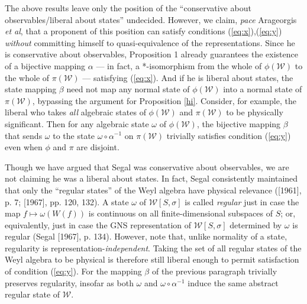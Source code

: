 \documentclass[12pt]{article}
\theoremstyle{remark}
\theoremstyle{definition}
\newcommand{\alg}[1]{\mathcal{#1}}
\begin{document}
The above results leave only the position of the ``conservative about
observables/liberal about states'' undecided.  However, we claim,
\emph{pace} Arageorgis \emph{et al}, that a proponent of this position
can satisfy conditions (\ref{eq:x}),(\ref{eq:y}) \emph{without}
committing himself to quasi-equivalence of the representations.  Since
he is conservative about observables, Proposition 1 already guarantees
the existence of a bijective mapping $\alpha$ --- in fact, a
*-isomorphism from the whole of $\phi(\alg{W})$ to the whole of
$\pi(\alg{W})$ --- satisfying (\ref{eq:x}).  And if he is liberal
about states, the state mapping $\beta$ need not map any normal state
of $\phi (\alg{W})$ into a normal state of $\pi (\alg{W})$, bypassing
the argument for Proposition \ref{hi}.  Consider, for example, the
liberal who takes \emph{all} algebraic states of $\phi(\alg{W})$ and
$\pi(\alg{W})$ to be physically significant.  Then for any algebraic
state $\omega$ of $\phi(\alg{W})$, the bijective mapping $\beta$ that
sends $\omega$ to the state $\omega\circ\alpha^{-1}$ on $\pi(\alg{W})$
trivially satisfies condition (\ref{eq:y}) even when $\phi$ and $\pi$
are disjoint.
 
Though we have argued that Segal was conservative about observables,
we are not claiming he was a liberal about states.  In fact, Segal
consistently maintained that only the ``regular states'' of the Weyl
algebra have physical relevance ([1961], p. 7; [1967], pp. 120, 132).
A state $\omega$ of $\alg{W}[S,\sigma]$ is called \emph{regular} just
in case the map $f\mapsto\omega(W(f))$ is continuous on all
finite-dimensional subspaces of $S$; or, equivalently, just in case
the GNS representation of $\alg{W}[S,\sigma]$ determined by $\omega$
is regular (Segal [1967], p. 134).  However, note that, unlike
normality of a state, regularity is representation-\emph{independent}.
Taking the set of all regular states of the Weyl algebra to be
physical is therefore still liberal enough to permit satisfaction of
condition (\ref{eq:y}).  For the mapping $\beta$ of the previous
paragraph trivially preserves regularity, insofar as both $\omega$ and
$\omega\circ\alpha^{-1}$ induce the same abstract regular state of
$\alg{W}$.
  
\end{document}
